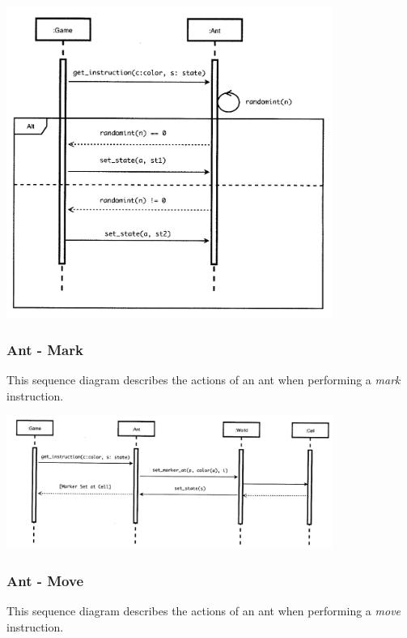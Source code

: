 \documentclass[11pt]{article}
\begin{document}
\begin{center}
\includegraphics[width=0.8\textwidth]{low-level-diagrams/sequence/ant-flip.png}
\end{center}

\subsubsection{Ant - Mark}

This sequence diagram describes the actions of an ant when performing a \textit{mark} instruction.

\begin{center}
\includegraphics[width=0.8\textwidth]{low-level-diagrams/sequence/ant-mark.png}
\end{center}

\subsubsection{Ant - Move}

This sequence diagram describes the actions of an ant when performing a \textit{move} instruction.
\end{document}
